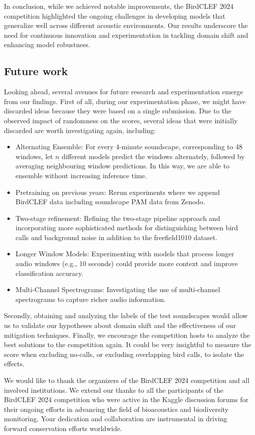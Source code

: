 \documentclass[
]{ceurart}
\begin{document}
In conclusion, while we achieved notable improvements, the BirdCLEF 2024 competition highlighted the ongoing challenges in developing models that generalize well across different acoustic environments. Our results underscore the need for continuous innovation and experimentation in tackling domain shift and enhancing model robustness.

\subsection{Future work} \label{future-work}
Looking ahead, several avenues for future research and experimentation emerge from our findings. First of all, during our experimentation phase, we might have discarded ideas because they were based on a single submission. Due to the observed impact of randomness on the scores, several ideas that were initially discarded are worth investigating again, including:
\begin{itemize}
    \item Alternating Ensemble: For every 4-minute soundscape, corresponding to 48 windows, let $n$ different models predict the windows alternately, followed by averaging neighbouring window predictions. In this way, we are able to ensemble without increasing inference time.
    \item Pretraining on previous years: Rerun experiments where we append BirdCLEF data including soundscape PAM data from Zenodo.
    \item Two-stage refinement: Refining the two-stage pipeline approach and incorporating more sophisticated methods for distinguishing between bird calls and background noise in addition to the freefield1010 dataset.
    \item Longer Window Models: Experimenting with models that process longer audio windows (e.g., 10 seconds) could provide more context and improve classification accuracy.
    \item Multi-Channel Spectrograms: Investigating the use of multi-channel spectrograms to capture richer audio information.
\end{itemize}
Secondly, obtaining and analyzing the labels of the test soundscapes would allow us to validate our hypotheses about domain shift and the effectiveness of our mitigation techniques.
Finally, we encourage the competition hosts to analyze the best solutions to the competition again. It could be very insightful to measure the score when excluding no-calls, or excluding overlapping bird calls, to isolate the effects.


\begin{acknowledgments}
We would like to thank the organizers of the BirdCLEF 2024 competition and all involved institutions. We extend our thanks to all the participants of the BirdCLEF 2024 competition who were active in the Kaggle discussion forums for their ongoing efforts in advancing the field of bioacoustics and biodiversity monitoring. Your dedication and collaboration are instrumental in driving forward conservation efforts worldwide.
\end{acknowledgments}




\end{document}
